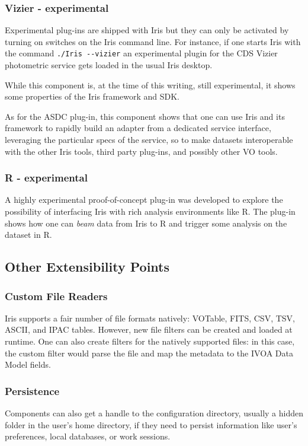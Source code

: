 \documentclass[5p]{elsarticle}
\begin{document}
\subsubsection{Vizier - experimental}
\label{sec:asdc}
Experimental plug-ins are shipped with Iris but they can only be activated by turning on switches on the Iris command line. For instance, if one starts Iris with the command \verb|./Iris --vizier| an experimental plugin for the CDS Vizier photometric service gets loaded in the usual Iris desktop.

While this component is, at the time of this writing, still experimental, it shows some properties of the Iris framework and SDK.

As for the ASDC plug-in, this component shows that one can use Iris and its framework to rapidly build an adapter from a dedicated service interface, leveraging the particular specs of the service, so to make datasets interoperable with the other Iris tools, third party plug-ins, and possibly other VO tools.

\subsubsection{R - experimental}
A highly experimental proof-of-concept plug-in was developed to explore the possibility of interfacing Iris with rich analysis environments like R. The plug-in shows how one can \emph{beam} data from Iris to R and trigger some analysis on the dataset in R.


\subsection{Other Extensibility Points}

\subsubsection{Custom File Readers}
Iris supports a fair number of {fi}le formats natively: VOTable,
FITS, CSV, TSV, ASCII, and IPAC tables. However, new {fi}le {fi}lters can be created and
loaded at runtime. One can also create {fi}lters for the natively supported {fi}les: in this
case, the custom {fi}lter would parse the {fi}le and map the metadata to the IVOA Data
Model {fi}elds.

\subsubsection{Persistence}
Components can also get a handle to the configuration directory, usually a hidden folder in the user's home directory, if they need to persist information like user's preferences, local databases, or work sessions.
\end{document}
